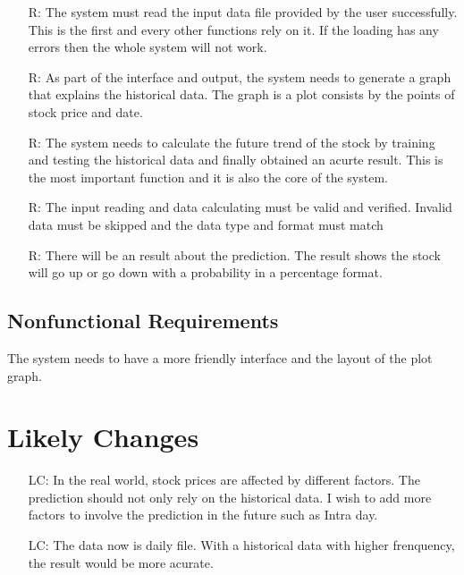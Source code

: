 \documentclass[12pt]{article}
\newcounter{reqnum} %
\newcounter{lcnum} %
\begin{document}
\noindent \begin{itemize}

\item[R\refstepcounter{reqnum}\thereqnum \label{R_Inputs}:] The system must read the input data file provided by the user successfully. This is the first and every other functions rely on it. If the loading has any errors then the whole system will not work. 

\item[R\refstepcounter{reqnum}\thereqnum \label{R_OutputInputs}:] As part of the interface and output, the system needs to generate a graph that explains  the historical data. The graph is a plot consists by the points of stock price and date.  


\item[R\refstepcounter{reqnum}\thereqnum \label{R_Calculate}:] The system needs to calculate the future trend of the stock by training and testing the historical data and finally obtained an acurte result. This is the most important function and it is also the core of the system.

\item[R\refstepcounter{reqnum}\thereqnum \label{R_VerifyOutput}:] The input reading and data calculating must be valid and verified. Invalid data must be skipped and the data type and format must match

\item[R\refstepcounter{reqnum}\thereqnum \label{R_Output}:]  There will be an result about the prediction. The result shows the stock will go up or go down with a probability in a percentage format.
\end{itemize}

\subsection{Nonfunctional Requirements}

The system needs to have a more friendly interface and the layout of the plot graph.

\section{Likely Changes}    

\noindent \begin{itemize}

\item[LC\refstepcounter{lcnum}\thelcnum\label{LC1}:] In the real world, stock prices are affected by different factors. The prediction should not only rely on the historical data. I wish to add more factors to involve the prediction in the future such as Intra day.
\item[LC\refstepcounter{lcnum}\thelcnum\label{LC2}:] The data now is daily file. With a historical data with higher frenquency, the result would be more acurate.

\end{itemize}
\end{document}
